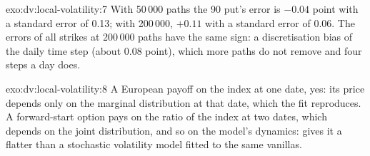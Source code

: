 \begin{solution}{exo:dv:local-volatility:7}
With 50\,000 paths the 90 put's error is $-0.04$ point with a standard error of 0.13; with 200\,000, $+0.11$ with a
standard error of 0.06. The errors of all strikes at 200\,000 paths have the same sign: a discretisation bias of the
daily time step (about 0.08 point), which more paths do not remove and four steps a day does.
\end{solution}

\begin{solution}{exo:dv:local-volatility:8}
A European payoff on the index at one date, yes: its price depends only on the marginal distribution at that date,
which the fit reproduces. A forward-start option pays on the ratio of the index at two dates, which depends on the
joint distribution, and so on the model's dynamics:  gives it a flatter  than a
stochastic volatility model fitted to the same vanillas.
\end{solution}

